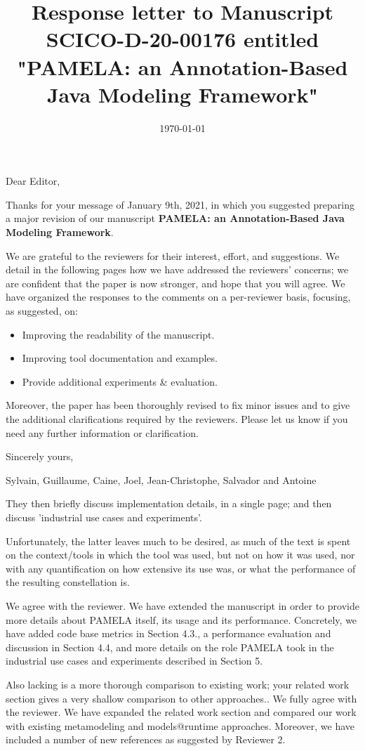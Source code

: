 \documentclass[10pt]{article}
\title{Response letter to Manuscript SCICO-D-20-00176 entitled "PAMELA: an Annotation-Based Java Modeling Framework"}
\date{\today}
\begin{document}
Dear Editor,

\bigskip
Thanks for your message of January 9th, 2021, in which you suggested preparing a major revision of our manuscript  \textbf{PAMELA: an Annotation-Based Java Modeling Framework}. 

\bigskip
We are grateful to the reviewers for their interest, effort, and suggestions. We detail in the following pages how we have addressed the reviewers' concerns; we are confident that the paper is now stronger, and hope that you will agree. We have organized the responses to the comments on a per-reviewer basis, focusing, as suggested, on: 

\begin{itemize}
\item Improving the readability of the manuscript. 
\item Improving tool documentation and examples.
\item Provide additional experiments \& evaluation.
\end{itemize}

Moreover, the paper has been thoroughly revised to fix minor issues and to give the additional clarifications required by the reviewers. Please let us know if you need any further information or clarification.

\bigskip
Sincerely yours,

\bigskip
Sylvain, Guillaume, Caine, Joel, Jean-Christophe, Salvador and Antoine

\pagebreak


\begin{response}{They then briefly discuss implementation details, in a single page; and then discuss 'industrial use cases and experiments'.

Unfortunately, the latter leaves much to be desired, as much of the text is spent on the context/tools in which the tool was used, but not on how it was used, nor with any quantification on how extensive its use was, or what the performance of the resulting constellation is.
} We agree with the reviewer. We have extended the manuscript in order to provide more details about PAMELA itself, its usage and its performance. Concretely, we have added code base metrics in Section 4.3., a performance evaluation and discussion in Section 4.4, and more details on the role PAMELA took in the industrial use cases and experiments described in Section 5.
\end{response}

\begin{response}{Also lacking is a more thorough comparison to existing work; your related work section gives a very shallow comparison to other approaches..}
We fully agree with the reviewer. We have expanded the related work section and compared our work with existing metamodeling and models@runtime approaches. Moreover, we have included a number of new references as suggested by Reviewer 2.
\end{response}
\end{document}
